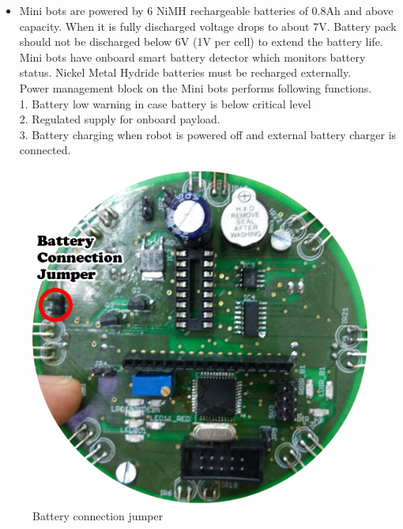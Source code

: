 \documentclass[a4paper,12pt,oneside]{book}
\begin{document}
	\begin{itemize}
	\item {Mini bots are powered by 6 NiMH rechargeable batteries of 0.8Ah and above capacity. When it is
	fully discharged voltage drops to about 7V. Battery pack should not be discharged below 6V (1V
	per cell) to extend the battery life. Mini bots have onboard smart battery detector which monitors
	battery status. Nickel Metal Hydride batteries must be recharged externally.\\
	Power management block on the Mini bots performs following functions.\\
	1. Battery low warning in case battery is below critical level\\
	2. Regulated supply for onboard payload.\\
	3. Battery charging when robot is powered off and external battery charger is
	connected.\\}
	\end{itemize}

	\begin{figure}[h!]
	\includegraphics[width=\textwidth]{./HardwareManual/BatteryIndication.jpg}
	\caption{Battery connection jumper}
\end{figure}	
	
\end{document}
